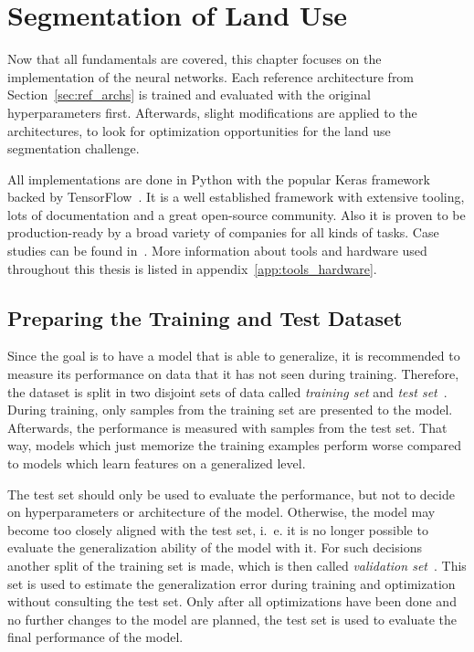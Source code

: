 \section{Segmentation of Land Use}
\label{sec:segmentation}
Now that all fundamentals are covered, this chapter focuses on the implementation of the neural networks. Each reference architecture from Section~\ref{sec:ref_archs} is trained and evaluated with the original hyperparameters first. Afterwards, slight modifications are applied to the architectures, to look for optimization opportunities for the land use segmentation challenge.

All implementations are done in Python with the popular Keras framework backed by TensorFlow~\cite{tf_whitepaper15}. It is a well established framework with extensive tooling, lots of documentation and a great open-source community. Also it is proven to be production-ready by a broad variety of companies for all kinds of tasks. Case studies can be found in~\cite{tf_casestudy20}. More information about tools and hardware used throughout this thesis is listed in appendix~\ref{app:tools_hardware}.

\subsection{Preparing the Training and Test Dataset}
\label{sec:prepare_train_test}
Since the goal is to have a model that is able to generalize, it is recommended to measure its performance on data that it has not seen during training. Therefore, the dataset is split in two disjoint sets of data called \emph{training set} and \emph{test set}~\cite[p.~101f]{DLbook16}. During training, only samples from the training set are presented to the model. Afterwards, the performance is measured with samples from the test set. That way, models which just memorize the training examples perform worse compared to models which learn features on a generalized level.

The test set should only be used to evaluate the performance, but not to decide on hyperparameters or architecture of the model. Otherwise, the model may become too closely aligned with the test set, i.~e. it is no longer possible to evaluate the generalization ability of the model with it. For such decisions another split of the training set is made, which is then called \emph{validation set}~\cite[p.~119]{DLbook16}. This set is used to estimate the generalization error during training and optimization without consulting the test set. Only after all optimizations have been done and no further changes to the model are planned, the test set is used to evaluate the final performance of the model.

